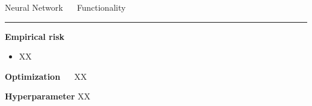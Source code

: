 \documentclass[11pt,compress,t,notes=noshow, xcolor=table]{beamer}
\begin{document}
\LARGE
\begin{frame}{\textcolor{gray!80}{Neural Network} ~~ Functionality}
\normalsize
\vspace{-0.5cm}
\noindent \textcolor{gray!80}{\rule{\textwidth}{1pt}}

\vspace{0.3cm}

\footnotesize

\textbf{\textcolor{gray!80}{Empirical risk}}

\begin{itemize}

\item XX
  
  
\end{itemize}


\medskip

\textbf{\textcolor{gray!80}{Optimization}} ~~
XX

\medskip

\textbf{\textcolor{gray!80}{Hyperparameter}} XX

\end{frame}

\end{document}
